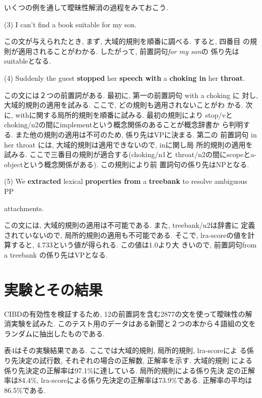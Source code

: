 いくつの例を通して曖昧性解消の過程をみておこう. 
\clearpage

(3) I can't find a book suitable for my son.
\vspace*{1.8mm}

この文が与えられたとき, まず, 大域的規則を順番に調べる. すると, 四番目
の規則が適用されることがわかる. したがって, 前置詞句{\it for my son}の
係り先はsuitableとなる.  

\vspace*{2mm}
(4) Suddenly the guest {\bf stopped} her {\bf speech with} a {\bf choking in} 
her {\bf throat}.
\vspace*{1.8mm}

この文には２つの前置詞がある. 最初に, 第一の前置詞句 with a choking に
対し, 大域的規則の適用を試みる. ここで, どの規則も適用されないことがわ
かる. 次に, withに関する局所的規則を順番に試みる. 最初の規則により
stop/vとchoking/n2の間にimplementという概念関係のあることが概念辞書か
ら判明する. また他の規則の適用は不可のため, 係り先はVPに決まる. 第二の
前置詞句 in her throat には, 大域的規則は適用できないので, inに関し局
所的規則の適用を試みる. ここで三番目の規則が適合する(choking/n1と
throat/n2の間にscopeとa-objectという概念関係がある). この規則により前
置詞句の係り先はNPとなる. 

\vspace*{2mm} 
(5) We {\bf extracted} lexical {\bf properties from} a {\bf treebank} 
to resolve ambiguous PP 

\hspace*{6mm}attachments.
\vspace*{1.8mm}

この文には, 大域的規則の適用は不可能である. また, treebank/n2は辞書に
定義されていないので, 局所的規則の適用も不可能である. そこで,
lra-scoreの値を計算すると, 4.733という値が得られる. この値は1.0より大
きいので, 前置詞句from a treebank の係り先はVPとなる. 

\vspace*{-3mm}
\section {実験とその結果}

\vspace*{-1mm}
CIBDの有効性を検証するため, 12の前置詞を含む2877の文を使って曖昧性の解消実験を試みた. このテスト用のデータはある新聞と２つの本から４語組の文をランダムに抽出したものである. 

表4はその実験結果である. ここでは大域的規則, 局所的規則, lra-scoreによ
る係り先決定の試行数, それぞれの場合の正解数, 正解率を示す. 大域的規則
による係り先決定の正解率は97.1\%に達している. 局所的規則による係り先決
定の正解率は84.4\%, lra-scoreによる係り先決定の正解率は73.9\%である.
正解率の平均は86.5\%である.  

